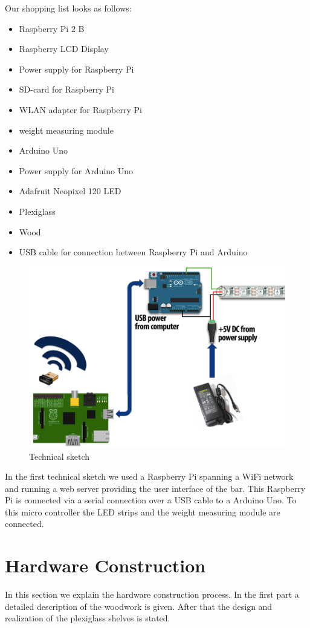 \documentclass{acm_proc_article-sp}
\begin{document}
Our shopping list looks as follows:
\begin{itemize}
\item Raspberry Pi 2 B
\item Raspberry LCD Display
\item Power supply for Raspberry Pi
\item SD-card for Raspberry Pi
\item WLAN adapter for Raspberry Pi
\item weight measuring module
\item Arduino Uno
\item Power supply for Arduino Uno
\item Adafruit Neopixel 120 LED
\item Plexiglass
\item Wood
\item USB cable for connection between Raspberry Pi and Arduino
\end{itemize}
\begin{figure}[htbp] 
  \centering
     \includegraphics[width=0.7\linewidth]{pictures/technical.png}
  \caption{Technical sketch}
  \label{fig:technical}
\end{figure}

In the first technical sketch we used a Raspberry Pi spanning a WiFi network and running a web server providing the user interface of the bar. This Raspberry Pi is connected via a serial connection over a USB cable to a Arduino Uno. To this micro controller the LED strips and the weight measuring module are connected.

\section{Hardware Construction}
In this section we explain the hardware construction process. In the first part a detailed description of the woodwork is given. After that the design and realization of the plexiglass shelves is stated.
\end{document}
